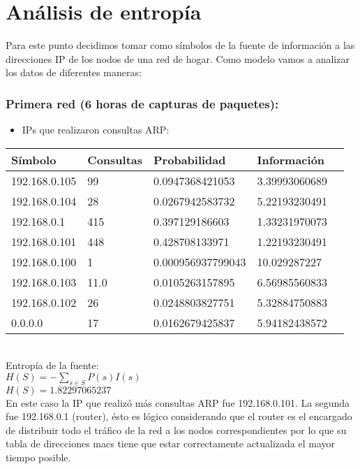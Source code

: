 \section{An\'alisis de entrop\'ia}


\indent Para este punto decidimos tomar como s\'imbolos de la fuente de informaci\'on a las direcciones IP de los nodos de una red de hogar.
Como modelo vamos a analizar los datos de diferentes maneras:

\subsubsection{Primera red (6 horas de capturas de paquetes):}

\begin{itemize}
 \item  IPs que realizaron consultas ARP:
\end{itemize}

\begin{tabular}{|l|l|l|l|l|}
  \hline
  S\'imbolo & Consultas & Probabilidad & Informaci\'on \\
  \hline
  192.168.0.105 & 99 & 0.0947368421053 & 3.39993060689 \\
  \hline
  192.168.0.104 & 28 & 0.0267942583732 & 5.22193230491 \\
  \hline
  192.168.0.1 & 415 & 0.397129186603  & 1.33231970073 \\
  \hline
  192.168.0.101 & 448 & 0.428708133971 & 1.22193230491 \\
  \hline
  192.168.0.100 & 1 & 0.000956937799043 & 10.029287227 \\
  \hline
  192.168.0.103 & 11.0 & 0.0105263157895 & 6.56985560833 \\
  \hline
  192.168.0.102 & 26 & 0.0248803827751 & 5.32884750883 \\
  \hline
  0.0.0.0 & 17 & 0.0162679425837 & 5.94182438572 \\
  \hline
\end{tabular}\\


Entrop\'ia de la fuente:\\
$H(S) = -\sum_{s \in S} P(s) I(s)$\\
$H(S) = 1.82297065237$\\

En este caso la IP que realiz\'o m\'as consultas ARP fue 192.168.0.101. 
La segunda fue 192.168.0.1 (router), \'esto es l\'ogico considerando que el router es el encargado de distribuir todo el tr\'afico de la red a los nodos correspondientes por lo que su tabla
de direcciones macs tiene que estar correctamente actualizada el mayor tiempo posible.

